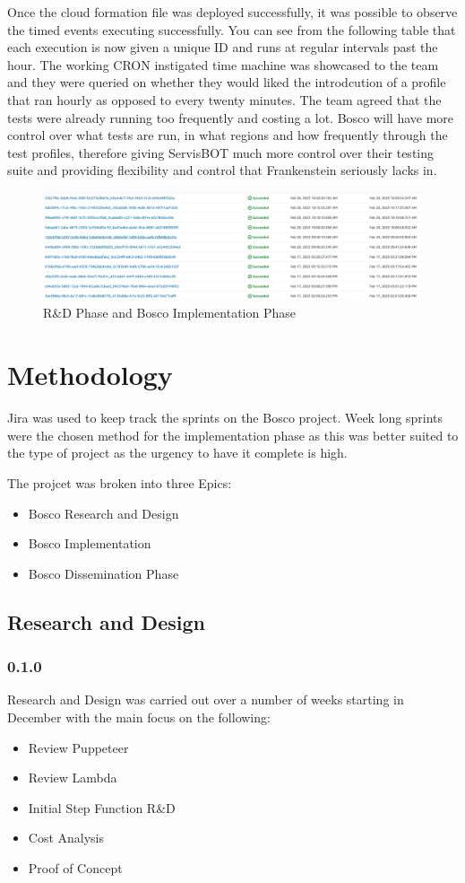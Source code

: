 \documentclass[12pt,a4paper,titlepage]{report}
\begin{document}
Once the cloud formation file was deployed successfully, it was possible to observe the timed events executing successfully. You can see from the following table 
that each execution is now given a unique ID and runs at regular intervals past the hour. The working CRON instigated time machine was showcased to the team and they were 
queried on whether they would liked the introdcution of a profile that ran hourly as opposed to every twenty minutes. The team agreed that the tests were already running too 
frequently and costing a lot. Bosco will have more control over what tests are run, in what regions and how frequently through the test profiles, therefore giving ServisBOT 
much more control over their testing suite and providing flexibility and control that Frankenstein seriously lacks in.

\begin{figure}[h]
  \centering
  \includegraphics[width=15cm]{./diagrams/state_machine_cron_executions.png}
  \caption{R\&D Phase and Bosco Implementation Phase}
 \end{figure}

\appendix
\chapter{Methodology}
Jira was used to keep track the sprints on the Bosco project. Week long sprints were the chosen method for the implementation phase as this
was better suited to the type of project as the urgency to have it complete is high.

The projcet was broken into three Epics:

\begin{itemize}
  \item Bosco Research and Design
  \item Bosco Implementation
  \item Bosco Dissemination Phase
\end{itemize}
\section{Research and Design}\subsection*{0.1.0}
Research and Design was carried out over a number of weeks starting in December with the main focus on the following:
\begin{itemize}
\item Review Puppeteer
\item Review Lambda
\item Initial Step Function R\&D
\item Cost Analysis
\item Proof of Concept
\end{itemize}
\end{document}
